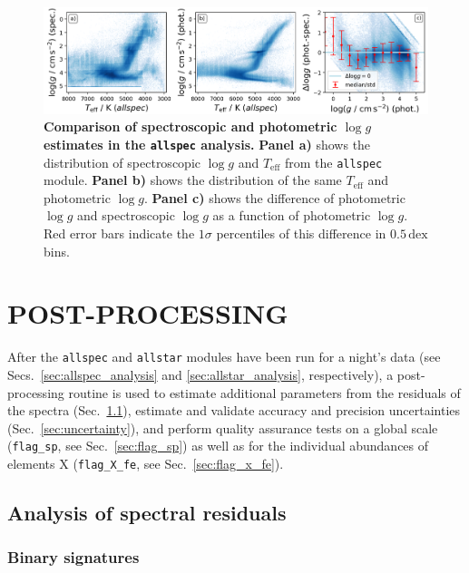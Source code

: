 \documentclass[
  journal=pasa,
  manuscript=research-paper, %
  year=2024,
  volume=37
]{cup-journal}
\newcommand{\Teff}{$T_\mathrm{eff}$\xspace}
\newcommand{\logg}{$\log g$\xspace}
\begin{document}
\begin{figure}[ht]
\centering
\includegraphics[width=\textwidth]{figures/dlogg_spec_plx.png}
\caption{\textbf{Comparison of spectroscopic and photometric \logg estimates in the \texttt{allspec} analysis.}
\textbf{Panel a)} shows the distribution of spectroscopic \logg and \Teff from the \texttt{allspec} module.
\textbf{Panel b)} shows the distribution of the same \Teff and photometric \logg.
\textbf{Panel c)} shows the difference of photometric \logg and spectroscopic \logg as a function of photometric \logg. Red error bars indicate the $1\sigma$ percentiles of this difference in $0.5\,\mathrm{dex}$ bins.}
\label{fig:dlogg_spec_plx}
\end{figure}

\section{POST-PROCESSING}
\label{sec:post_processing}

After the \texttt{allspec} and  \texttt{allstar} modules have been run for a night's data (see Secs.~\ref{sec:allspec_analysis} and \ref{sec:allstar_analysis}, respectively), a post-processing routine is used to estimate additional parameters from the residuals of the spectra (Sec.~\ref{sec:residual_analysis}), estimate and validate accuracy and precision uncertainties (Sec.~\ref{sec:uncertainty}), and perform quality assurance tests on a global scale (\texttt{flag\_sp}, see Sec.~\ref{sec:flag_sp}) as well as for the individual abundances of elements X (\texttt{flag\_X\_fe}, see Sec.~\ref{sec:flag_x_fe}).

\subsection{Analysis of spectral residuals} \label{sec:residual_analysis}

\subsubsection{Binary signatures} \label{sec:trigger_binary_module}
\end{document}
